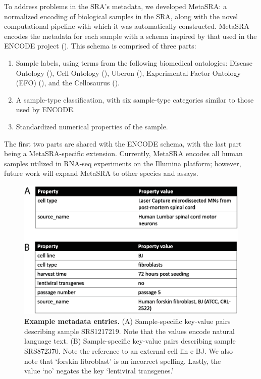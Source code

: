 To address problems in the SRA's metadata, we developed MetaSRA: a normalized encoding of biological samples in the SRA, along with the novel computational pipeline with which it was automatically constructed.   MetaSRA encodes the metadata for each sample with a schema inspired by that used in the ENCODE project (\citealp{Malladi}).  This schema is comprised of three parts:
\begin{enumerate}
\item Sample labels, using terms from the following biomedical ontologies: Disease Ontology (\citealp{Kibbe}), Cell Ontology (\citealp{Bard}), Uberon (\citealp{Mungall}), Experimental Factor Ontology (EFO) (\citealp{Malone}), and the Cellosaurus (\citealp{Bairoch2018}). 
\item A sample-type classification, with six sample-type categories similar to those used by ENCODE.
\item Standardized numerical properties of the sample.
\end{enumerate}
The first two parts are shared with the ENCODE schema, with the last part being a MetaSRA-specific extension. Currently, MetaSRA encodes all human samples utilized in RNA-seq experiments on the Illumina platform; however, future work will expand MetaSRA to other species and assays.

\begin{figure}[!tpb]
\centerline{\includegraphics[width=13cm]{figures/example_key_vals.eps}}
\caption{\textbf{Example metadata entries.} (A) Sample-specific key-value pairs describing sample SRS1217219. Note that the values encode natural language text. (B) Sample-specific key-value pairs describing sample SRS872370. Note the reference to an external cell lin
e BJ. We also note that `forskin fibroblast' is an incorrect spelling. Lastly, the value `no' negates the key `lentiviral transgenes.'}
\label{fig:example_raw_key_vals}
\end{figure}

